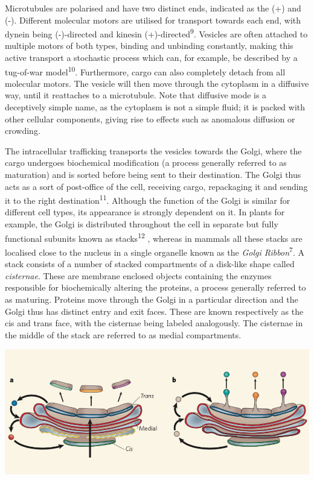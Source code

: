 \documentclass{Dissertate}
\let\origfigure\figure
\let\endorigfigure\endfigure
\renewenvironment{figure}[1][2] {
    \expandafter\origfigure\expandafter[H]
} {
    \endorigfigure
}
\begin{document}
Microtubules are polarised and have two distinct ends, indicated as the
(+) and (-). Different molecular motors are utilised for transport
towards each end, with dynein being (-)-directed and kinesin
(+)-directed\textsuperscript{9}. Vesicles are often attached to multiple
motors of both types, binding and unbinding constantly, making this
active transport a stochastic process which can, for example, be
described by a tug-of-war model\textsuperscript{10}. Furthermore, cargo
can also completely detach from all molecular motors. The vesicle will
then move through the cytoplasm in a diffusive way, until it reattaches
to a microtubule. Note that diffusive mode is a deceptively simple name,
as the cytoplasm is not a simple fluid; it is packed with other cellular
components, giving rise to effects such as anomalous diffusion or
crowding.

The intracellular trafficking transports the vesicles towards the Golgi,
where the cargo undergoes biochemical modification (a process generally referred to as maturation) and is sorted before
being sent to their destination. The Golgi thus acts as a sort of
post-office of the cell, receiving cargo, repackaging it and sending it to
the right destination\textsuperscript{11}. Although the function of the
Golgi is similar for different cell types, its appearance is strongly
dependent on it. In plants for example, the Golgi is distributed
throughout the cell in separate but fully functional subunits known as
stacks\textsuperscript{12} , whereas in mammals all these stacks are
localised close to the nucleus in a single organelle known as the
\emph{Golgi Ribbon}\textsuperscript{7}. A stack consists of a number of
stacked compartments of a disk-like shape called \emph{cisternae}. These
are membrane enclosed objects containing the enzymes responsible for
biochemically altering the proteins, a process generally referred to as
maturing. Proteins move through the Golgi in a particular direction and
the Golgi thus has distinct entry and exit faces. These are known
respectively as the cis and trans face, with the cisternae being labeled
analogously. The cisternae in the middle of the stack are referred to as
medial compartments.

\begin{figure}
\hypertarget{fig:Golgimodels}{%
\centering
\includegraphics{source/figures/png/Golgimodels.png}
\caption{\textbf{Left panel}: In the cisternal maturation model,
compartments mature as a whole and thus change identity. \textbf{Right
panel}: In the vesicle transport model, compartments are static objects
and cargo is being transported from compartment to compartment by
vesicles. Image taken from 13.}\label{fig:Golgimodels}
}
\end{figure}
\end{document}
